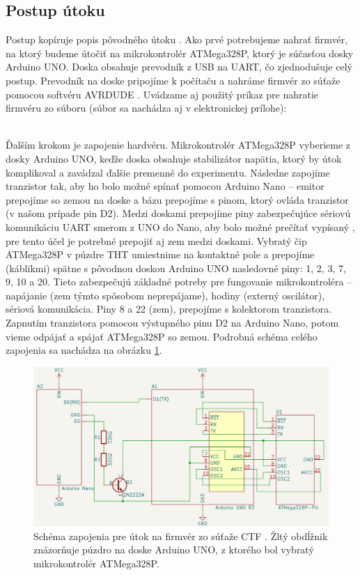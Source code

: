 \subsection{Postup útoku}
Postup kopíruje popis pôvodného útoku \cite{vccOnTheCheap}. Ako prvé potrebujeme nahrať firmvér, na ktorý budeme útočiť na mikrokontrolér ATMega328P, ktorý je súčasťou dosky Arduino UNO. Doska obsahuje prevodník z USB na UART, čo zjednodušuje celý postup. Prevodník na doske pripojíme k počítaču a nahráme firmvér zo súťaže pomocou softvéru AVRDUDE \cite{avrdude}. Uvádzame aj použitý príkaz pre nahratie firmvéru zo súboru  \cite{vccOnTheCheap} (súbor sa nachádza aj v elektronickej prílohe):\\
\footnotesize {}\\
\normalsize

Ďalším krokom je zapojenie hardvéru. Mikrokontrolér ATMega328P vyberieme z dosky Arduino UNO, keďže doska obsahuje stabilizátor napätia, ktorý by útok komplikoval a zavádzal ďalšie premenné do experimentu. Následne zapojíme tranzistor tak, aby ho bolo možné spínať pomocou Arduino Nano -- emitor prepojíme so zemou na doske a bázu prepojíme s pinom, ktorý ovláda tranzistor (v našom prípade pin D2). Medzi doskami prepojíme piny zabezpečujúce sériovú komunikáciu UART smerom z UNO do Nano, aby bolo možné prečítať vypísaný , pre tento účel je potrebné prepojiť aj zem medzi doskami. Vybratý čip ATMega328P v púzdre THT umiestnime na kontaktné pole a prepojíme (káblikmi) spätne s pôvodnou doskou Arduino UNO nasledovné piny: 1, 2, 3, 7, 9, 10 a 20. Tieto zabezpečujú základné potreby pre fungovanie mikrokontroléra -- napájanie (zem týmto spôsobom neprepájame), hodiny (externý oscilátor), sériová komunikácia. Piny 8 a 22 (zem), prepojíme s kolektorom tranzistora. Zapnutím tranzistora pomocou výstupného pinu D2 na Arduino Nano, potom vieme odpájať a spájať ATMega328P so zemou. Podrobná schéma celého zapojenia sa nachádza na obrázku \ref{obr:schemeCTF}.

\begin{figure}
    \centerline{\includegraphics[width=1\textwidth]{images/schemeCTF.png}}
    \caption[Schéma zapojenia pre útok na firmvér zo súťaže CTF]{Schéma zapojenia pre útok na firmvér zo súťaže CTF \cite{vccOnTheCheap}. Žltý obdĺžnik znázorňuje púzdro na doske Arduino UNO, z ktorého bol vybratý mikrokontrolér ATMega328P.}
    \label{obr:schemeCTF}
\end{figure}

